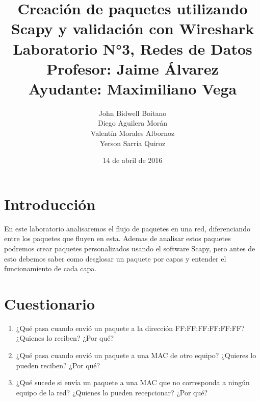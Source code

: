 \documentclass[spanish]{udpreport}
\begin{document}
\title{
	Creación de paquetes utilizando Scapy y validación con Wireshark\\[2ex]
	\normalsize
	Laboratorio N°3, Redes de Datos\\
    Profesor: Jaime Álvarez\\
	Ayudante: Maximiliano Vega
    }
\author{John Bidwell Boitano\\ Diego Aguilera Morán \\ Valentín Morales Albornoz \\ Yerson Sarria Quiroz}
\date{14 de abril de 2016}
\maketitle

\tableofcontents

\chapter{Introducción}
En este laboratorio analisaremos el flujo de paquetes en una red, diferenciando entre los paquetes que fluyen en esta.
Ademas de analisar estos paquetes podremos crear paquetes personalizados usando el software Scapy, pero antes de esto debemos saber como desglosar un paquete por capas y entender el funcionamiento de cada capa.
\chapter{Cuestionario}
\begin{enumerate}

\item¿Qué  pasa  cuando  envió  un  paquete  a  la  dirección  FF:FF:FF:FF:FF:FF?  ¿Quienes 
lo reciben? ¿Por qué?

\item¿Qué  pasa  cuando  envió  un  paquete  a  una  MAC  de  otro  equipo?  ¿Quieres  lo pueden reciben? ¿Por qué?

\item¿Qué  sucede  si  envía  un  paquete  a  una  MAC  que  no  corresponda  a  ningún  equipo de la red? ¿Quienes lo pueden recepcionar? ¿Por qué?

\end{enumerate}
\end{document}
